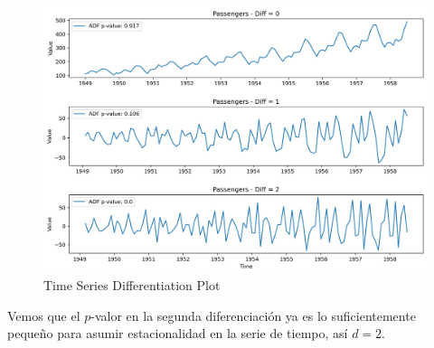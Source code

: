 \begin{figure}[H]
    \center
    \includegraphics[scale=0.5]{notebooks/TS/img/time_series_differentiation.png}
    \caption{Time Series Differentiation Plot}
\end{figure}

Vemos que el $p$-valor en la segunda diferenciación ya es lo suficientemente pequeño para asumir estacionalidad en la serie de tiempo, así $d=2$. 

